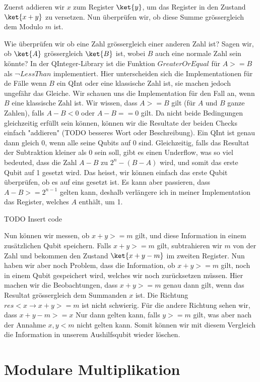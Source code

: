 Zuerst addieren wir $x$ zum Register $\ket{y}$, um das Register in den Zustand $\ket{x + y}$ zu versetzen. Nun überprüfen wir, ob diese Summe grössergleich dem Modulo $m$ ist. 

Wie überprüfen wir ob eine Zahl grössergleich einer anderen Zahl ist? Sagen wir, ob $\ket{A}$ grössergleich $\ket{B}$ ist, wobei $B$ auch eine normale Zahl sein könnte? In der QInteger-Library ist die Funktion $GreaterOrEqual$ für $A >= B$ als ¬$LessThan$ implementiert. Hier unterscheiden sich die Implementationen für de Fälle wenn $B$ ein QInt oder eine klassische Zahl ist, sie machen jedoch ungefähr das Gleiche. Wir schauen uns die Implementation für den Fall an, wenn $B$ eine klassische Zahl ist. Wir wissen, dass $A >= B$ gilt (für $A$ und $B$ ganze Zahlen), falls $A - B < 0$ oder $A - B == 0$ gilt. Da nicht beide Bedingungen gleichzeitig erfüllt sein können, können wir die Resultate der beiden Checks einfach "addieren" (TODO besseres Wort oder Beschreibung). Ein QInt ist genau dann gleich 0, wenn alle seine Qubits auf 0 sind. Gleichzeitig, falls das Resultat der Subtraktion kleiner als $0$ sein soll, gibt es einen Underflow, was so viel bedeuted, dass die Zahl $A - B$ zu $2^n - (B - A)$ wird, und somit das erste Qubit auf 1 gesetzt wird. Das heisst, wir können einfach das erste Qubit überprüfen, ob es auf eins gesetzt ist. Es kann aber passieren, dass $A - B >= 2^{n - 1}$ gelten kann, deshalb verlängere ich in meiner Implementation das Register, welches $A$ enthält, um 1.

TODO Insert code

Nun können wir messen, ob $x + y >= m$ gilt, und diese Information in einem zusätzlichen Qubit speichern. Falls $x + y >= m$ gilt, subtrahieren wir $m$ von der Zahl und bekommen den Zustand $\ket{x + y - m}$ im zweiten Register. Nun haben wir aber noch Problem, dass die Information, ob $x + y >= m$ gilt, noch in einem Qubit gespeichert wird, welches wir noch zurücksetzen müssen. Hier machen wir die Beobachtungen, dass $x + y >= m$ genau dann gilt, wenn das Resultat grössergleich dem Summanden $x$ ist. Die Richtung $res < x \rightarrow x + y >= m$ ist nicht schwierig. Für die andere Richtung sehen wir, dass $x + y - m >= x$ Nur dann gelten kann, falls $y >= m$ gilt, was aber nach der Annahme $x, y < m$ nicht gelten kann. Somit können wir mit diesem Vergleich die Information in unserem Aushilfsqubit wieder löschen.

\section{Modulare Multiplikation}
